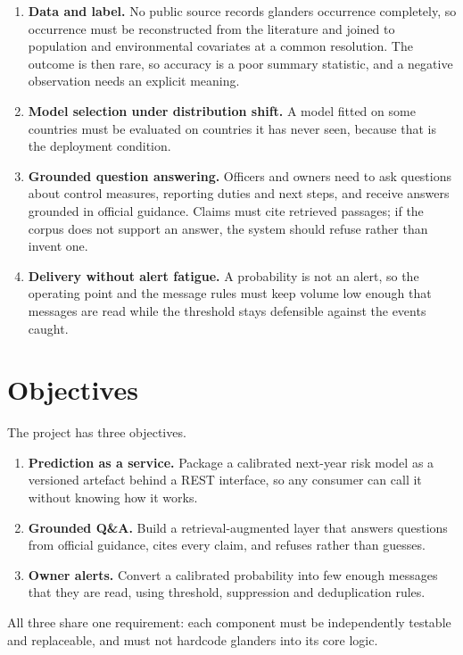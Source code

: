 \documentclass[10pt,openany]{report}
\begin{document}
\begin{enumerate}
  \item \textbf{Data and label.} No public source records glanders occurrence completely, so
        occurrence must be reconstructed from the literature and joined to population and
        environmental covariates at a common resolution. The outcome is then rare, so accuracy is
        a poor summary statistic, and a negative observation needs an explicit meaning.
  \item \textbf{Model selection under distribution shift.} A model fitted on some countries must be
        evaluated on countries it has never seen, because that is the deployment condition.
  \item \textbf{Grounded question answering.} Officers and owners need to ask questions about
        control measures, reporting duties and next steps, and receive answers grounded in official
        guidance. Claims must cite retrieved passages; if the corpus does not support an answer, the
        system should refuse rather than invent one.
  \item \textbf{Delivery without alert fatigue.} A probability is not an alert, so the operating
        point and the message rules must keep volume low enough that messages are read while the
        threshold stays defensible against the events caught.
\end{enumerate}

\section{Objectives}

The project has three objectives.

\begin{enumerate}
  \item \textbf{Prediction as a service.} Package a calibrated next-year risk model as a versioned
        artefact behind a REST interface, so any consumer can call it without knowing how it works.
  \item \textbf{Grounded Q\&A.} Build a retrieval-augmented layer that answers questions from
        official guidance, cites every claim, and refuses rather than guesses.
  \item \textbf{Owner alerts.} Convert a calibrated probability into few enough messages that they
        are read, using threshold, suppression and deduplication rules.
\end{enumerate}

All three share one requirement: each component must be independently testable and replaceable, and
must not hardcode glanders into its core logic.
\end{document}
